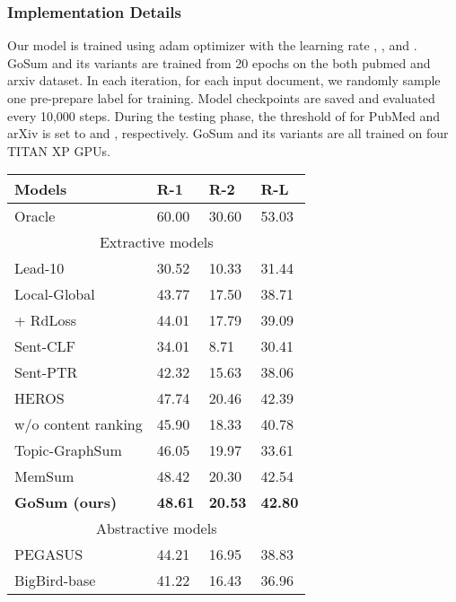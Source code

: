 \documentclass[11pt,a4paper]{article}
\begin{document}
\subsubsection{Implementation Details}
Our model is trained using adam\cite{adam_2015} optimizer with the learning rate , , and .
GoSum and its variants are trained from 20 epochs on the both pubmed and arxiv dataset.
In each iteration, for each input document, we randomly sample one pre-prepare label for training.
Model checkpoints are saved and evaluated every 10,000 steps.
During the testing phase, the threshold of  for PubMed and arXiv is set to  and , respectively.
GoSum and its variants are all trained on four TITAN XP GPUs.


\begin{table}[t]
  \centering
  \begin{tabular}{p{36mm}|p{8mm}p{8mm}p{8mm}}\toprule
        Models          &  R-1  &  R-2  &  R-L   \\ \midrule
        Oracle                          & 60.00 & 30.60 & 53.03  \\  \midrule
        \multicolumn{4}{c}{Extractive models}  \\ \midrule
Lead-10                       & 30.52 & 10.33 & 31.44  \\
          Local-Global                  & 43.77 & 17.50 & 38.71  \\
          \quad + RdLoss                & 44.01 & 17.79 & 39.09  \\
          Sent-CLF                      & 34.01 &  8.71 & 30.41  \\
          Sent-PTR                      & 42.32 & 15.63 & 38.06  \\
          HEROS                         & 47.74 & 20.46 & 42.39  \\
          \quad w/o content ranking     & 45.90 & 18.33 & 40.78  \\
          Topic-GraphSum                & 46.05 & 19.97 & 33.61  \\
          MemSum                        & 48.42 & 20.30 & 42.54  \\
          \textbf{GoSum (ours)}         & \textbf{48.61} & \textbf{20.53} & \textbf{42.80}  \\ \midrule
          \multicolumn{4}{c}{Abstractive models}  \\ \midrule
          PEGASUS                       & 44.21 & 16.95 & 38.83  \\
          BigBird-base                  & 41.22 & 16.43 & 36.96  \\

\end{tabular}
\end{table}
\end{document}
